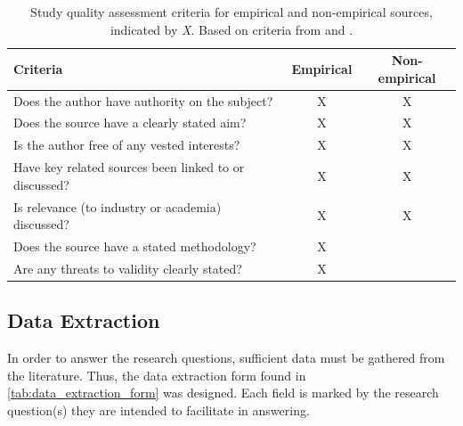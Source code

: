 \begin{table}[]
    \centering
    \begin{tabular}{l c c}
        Criteria & Empirical & Non-empirical \\
        \hline
        Does the author have authority on the subject? & X & X \\
        Does the source have a clearly stated aim? & X & X \\
        Is the author free of any vested interests? & X & X \\
        Have key related sources been linked to or discussed? & X & X \\
        Is relevance (to industry or academia) discussed? & X & X \\
        Does the source have a stated methodology? & X &  \\
        Are any threats to validity clearly stated? & X & \\
    \end{tabular}
    \caption{Study quality assessment criteria for empirical and non-empirical sources, indicated by \emph{X}. Based on criteria from \cite{Garousi2016} and \cite{Giray2021}.}
    \label{tab:study_quality_criteria}
\end{table}

\subsection{Data Extraction}
\label{sec:method:data_extraction}
In order to answer the research questions, sufficient data must be gathered from the literature.
Thus, the data extraction form found in \cref{tab:data_extraction_form} was designed.
Each field is marked by the research question(s) they are intended to facilitate in answering.


